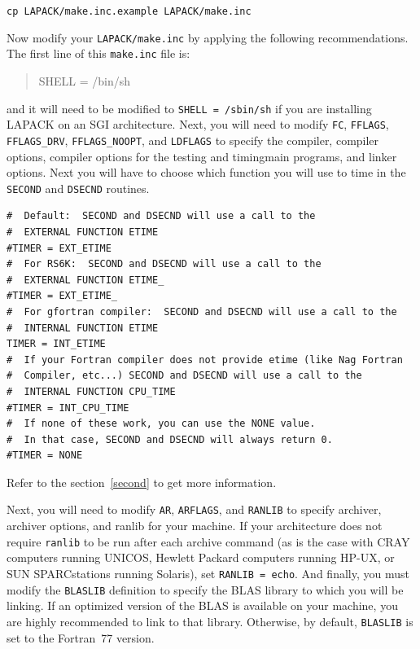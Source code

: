 \documentclass[11pt]{report}
\begin{document}
\begin{list}{}
\item{\texttt{cp LAPACK/make.inc.example LAPACK/make.inc}}
\end{list}

\noindent
Now modify your \texttt{LAPACK/make.inc} by applying the following recommendations.
The first line of this \texttt{make.inc} file is:
\begin{quote}
SHELL = /bin/sh
\end{quote}
and it will need to be modified to \texttt{SHELL = /sbin/sh} if you are
installing LAPACK on an SGI architecture.
Next, you will need to modify \texttt{FC}, \texttt{FFLAGS},
\texttt{FFLAGS\_DRV}, \texttt{FFLAGS\_NOOPT}, and \texttt{LDFLAGS} to specify
the compiler, compiler options, compiler options for the testing and
timing\footnotemark[\value{footnote}] main programs, and linker options.
Next you will have to choose which function you will use to time in the
\texttt{SECOND} and \texttt{DSECND} routines.
\begin{verbatim}
#  Default:  SECOND and DSECND will use a call to the
#  EXTERNAL FUNCTION ETIME
#TIMER = EXT_ETIME
#  For RS6K:  SECOND and DSECND will use a call to the
#  EXTERNAL FUNCTION ETIME_
#TIMER = EXT_ETIME_
#  For gfortran compiler:  SECOND and DSECND will use a call to the
#  INTERNAL FUNCTION ETIME
TIMER = INT_ETIME
#  If your Fortran compiler does not provide etime (like Nag Fortran
#  Compiler, etc...) SECOND and DSECND will use a call to the
#  INTERNAL FUNCTION CPU_TIME
#TIMER = INT_CPU_TIME
#  If none of these work, you can use the NONE value.
#  In that case, SECOND and DSECND will always return 0.
#TIMER = NONE
\end{verbatim}
Refer to the section~\ref{second} to get more information.


Next, you will need to modify \texttt{AR}, \texttt{ARFLAGS}, and \texttt{RANLIB} to specify archiver,
archiver options, and ranlib for your machine.  If your architecture
does not require \texttt{ranlib} to be run after each archive command (as
is the case with CRAY computers running UNICOS, Hewlett Packard
computers running HP-UX, or SUN SPARCstations running Solaris), set
\texttt{RANLIB = echo}.  And finally, you must
modify the \texttt{BLASLIB} definition to specify the BLAS library to which
you will be linking.  If an optimized version of the BLAS is available
on your machine, you are highly recommended to link to that library.
Otherwise, by default, \texttt{BLASLIB} is set to the Fortran~77 version.
\end{document}
